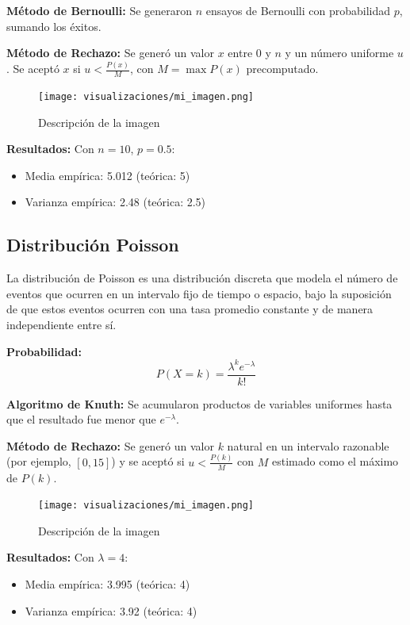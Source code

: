 \documentclass{article}
\begin{document}
\textbf{Método de Bernoulli:} Se generaron $n$ ensayos de Bernoulli con probabilidad $p$, sumando los éxitos.

\textbf{Método de Rechazo:} Se generó un valor $x$ entre $0$ y $n$ y un número uniforme $u$. Se aceptó $x$ si $u < \frac{P(x)}{M}$, con $M = \max P(x)$ precomputado.
\begin{figure}[H] %
    \centering
    \texttt{[image: visualizaciones/mi\_imagen.png]}
    \caption{Descripción de la imagen}
    \label{fig:mi_imagen}
\end{figure}


\textbf{Resultados:} Con $n=10$, $p=0.5$:
\begin{itemize}
\item Media empírica: 5.012 (teórica: 5)
\item Varianza empírica: 2.48 (teórica: 2.5)
\end{itemize}

\subsection{Distribución Poisson}
La distribución de Poisson es una distribución discreta que modela el número de eventos que ocurren en un intervalo fijo de tiempo o espacio, bajo la suposición de que estos eventos ocurren con una tasa promedio constante y de manera independiente entre sí.

\textbf{Probabilidad:}
\begin{equation}
P(X = k) = \frac{\lambda^k e^{-\lambda}}{k!}
\end{equation}

\textbf{Algoritmo de Knuth:} Se acumularon productos de variables uniformes hasta que el resultado fue menor que $e^{-\lambda}$.

\textbf{Método de Rechazo:} Se generó un valor $k$ natural en un intervalo razonable (por ejemplo, $[0,15]$) y se aceptó si $u < \frac{P(k)}{M}$ con $M$ estimado como el máximo de $P(k)$.
\begin{figure}[H] %
    \centering
    \texttt{[image: visualizaciones/mi\_imagen.png]}
    \caption{Descripción de la imagen}
    \label{fig:mi_imagen}
\end{figure}

\textbf{Resultados:} Con $\lambda=4$:
\begin{itemize}
\item Media empírica: 3.995 (teórica: 4)
\item Varianza empírica: 3.92 (teórica: 4)
\end{itemize}
\end{document}
